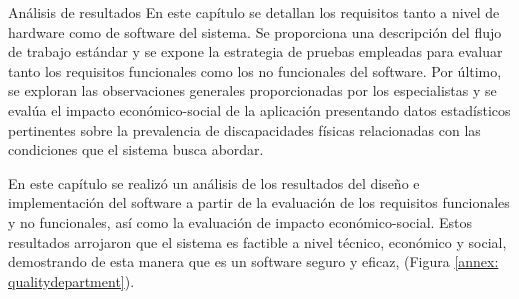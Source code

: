 \begin{thesischapter}{3} {Análisis de resultados}
En este capítulo se detallan los requisitos tanto a nivel de hardware como de software del sistema. Se proporciona una descripción del flujo de trabajo estándar y se expone la estrategia de pruebas empleadas para evaluar tanto los requisitos funcionales como los no funcionales del software. Por último, se exploran las observaciones generales proporcionadas por los especialistas y se evalúa el impacto económico-social de la aplicación presentando datos estadísticos pertinentes sobre la prevalencia de discapacidades físicas relacionadas con las condiciones que el sistema busca abordar.











En este capítulo se realizó un análisis de los resultados del diseño e implementación del software a partir de la  evaluación de los requisitos funcionales y no funcionales, así como la evaluación  de impacto económico-social. Estos resultados arrojaron que el sistema es factible a nivel técnico, económico y social, demostrando de esta manera que es un software seguro y eficaz, (Figura \ref{annex: qualitydepartment}).
\end{thesischapter}